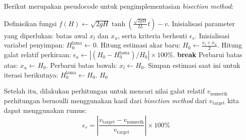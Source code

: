 \documentclass[conference]{IEEEtran}
\begin{document}
Berikut merupakan pseudocode untuk pengimplementasian \textit{bisection method}:
\begin{flushleft}
\begin{algorithmic}[1]
    \State Definisikan fungsi $f(H) \gets \sqrt{2gH} \tanh\left(\frac{\sqrt{2gH}}{2L}t\right) - v$.
    \State Inisialisasi parameter yang diperlukan: batas awal $x_l$ dan $x_u$, serta kriteria berhenti $\epsilon_s$.
    \State Inisialisasi variabel penyimpan: $H_0^{\text{lama}} \gets 0$.
        \State Hitung estimasi akar baru: $H_0 \gets \frac{x_l + x_u}{2}$.
        \State Hitung galat relatif perkiraan: $\epsilon_a \gets \left| (H_0 - H_0^{\text{lama}}) / H_0 \right| \times 100\%$.
            \State \textbf{break}
        \EndIf
            \State Perbarui batas atas: $x_u \gets H_0$.
        \Else
            \State Perbarui batas bawah: $x_l \gets H_0$.
        \EndIf
        \State Simpan estimasi saat ini untuk iterasi berikutnya: $H_0^{\text{lama}} \gets H_0$.
    \EndWhile
    \State \Return $H_0$
\end{algorithmic}
\end{flushleft}

Setelah itu, dilakukan perhitungan untuk mencari nilai galat relatif $v_\text{numerik}$ perhitungan bernoulli menggunakan hasil dari \textit{bisection method} dari $v_\text{target}$ kita dapat menggunakan rumus:
\begin{equation}
\epsilon_r = \left| \frac{v_{\text{target}} - v_{\text{numerik}}}{v_{\text{target}}} \right| \times 100\%
\end{equation}
\end{document}
